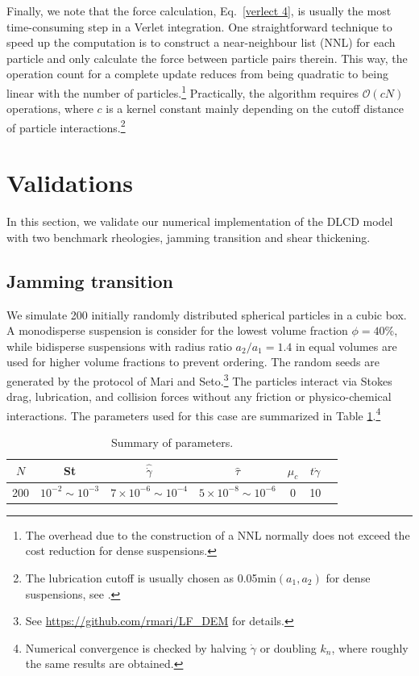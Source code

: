 Finally, we note that the force calculation, Eq.\ \eqref{verlect 4}, is usually the most time-consuming step in a Verlet integration. One straightforward technique to speed up the computation is to construct a near-neighbour list (NNL) for each particle and only calculate the force between particle pairs therein. This way, the operation count for a complete update reduces from being quadratic to being linear with the number of particles.\footnote{The overhead due to the construction of a NNL normally does not exceed the cost reduction for dense suspensions.} Practically, the algorithm requires $\mathcal{O}(cN)$ operations, where $c$ is a kernel constant mainly depending on the cutoff distance of particle interactions.\footnote{The lubrication cutoff is usually chosen as 0.05min$(a_1,a_2)$ for dense suspensions, see \cite{Cheal_Ness_2018}.}


\section{Validations}
\label{valid}

In this section, we validate our numerical implementation of the DLCD model with two benchmark rheologies, \ie jamming transition and shear thickening.

\subsection{Jamming transition}

We simulate 200 initially randomly distributed spherical particles in a cubic box. A monodisperse suspension is consider for the lowest volume fraction $\phi=40$\%, while bidisperse suspensions with radius ratio $a_2/a_1=1.4$ in equal volumes are used for higher volume fractions to prevent ordering. The random seeds are generated by the protocol of Mari and Seto.\footnote{See \url{https://github.com/rmari/LF_DEM} for details.} The particles interact via Stokes drag, lubrication, and collision forces without any friction or physico-chemical interactions. The parameters used for this case are summarized in Table \ref{tab:param}.\footnote{Numerical convergence is checked by halving $\dot{\gamma}$ or doubling $k_n$, where roughly the same results are obtained.}

\begin{table}[h]
  \centering
  \caption{Summary of parameters.}
  \renewcommand{\arraystretch}{1.2}%
  \begin{tabular}{ccccccc}
    \hline
    $N$ & St & $\hat{\dot{\gamma}}$ & $\hat{\tau}$ & $\mu_c$ & $t\dot{\gamma}$\\
    \hline
    200 & $10^{-2}\sim 10^{-3}$ & $7\times 10^{-6}\sim 10^{-4}$ & $5\times 10^{-8}\sim 10^{-6}$  & 0 & 10 \\
    \hline
  \end{tabular}
  \label{tab:param}
\end{table}


